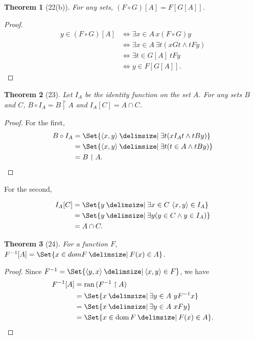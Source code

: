 \documentclass[12pt]{article}
\theoremstyle{plain}
\newtheorem*{exthm}{Theorem}
\theoremstyle{remark}
\theoremstyle{definition}
\theoremstyle{remark}
\providecommand\st{}
\newcommand\SetSymbol[1][]{%
  \nonscript\:#1\vert%
  \allowbreak%
  \nonscript\:
\mathopen{}}
\DeclarePairedDelimiter{\ang}{\langle}{\rangle}
\renewcommand\st{\SetSymbol[\delimsize]}
\renewcommand{\iff}{\Leftrightarrow}
\DeclareMathOperator{\dom}{dom}
\DeclareMathOperator{\ran}{ran}
\begin{document}
\begin{exthm}[22(b)]
  For any sets, $(F \circ G)[A] = F[G[A]]$.
\end{exthm}
\begin{proof}
  \begin{align*}
    y \in (F \circ G)[A] &\iff \exists x \in A\, x (F \circ G)y\\
                         &\iff \exists x \in A\, \exists t (xGt \land tFy)\\
                         &\iff \exists t \in G[A]\ tFy\\
                         &\iff y \in F[G[A]].
  \end{align*}
\end{proof}

\begin{exthm}[23]
  Let $I_A$ be the identity function on the set $A$. For any sets $B$ and $C$, $B \circ I_A = B \restriction A$ and $I_A[C] = A \cap C$.
\end{exthm}
\begin{proof}
  For the first,
  \begin{align*}
    B \circ I_A &= \Set{\ang{x,y} \st \exists t (xI_A t \land tBy)}\\
                &= \Set{\ang{x,y} \st \exists t (t \in A \land tBy)}\\
                &= B \restriction A.
  \end{align*}
\end{proof}

For the second,

\begin{align*}
  I_A [C] &= \Set{y \st \exists x \in C\ \ang{x, y} \in I_A}\\
          &= \Set{y \st \exists y (y \in C \land y \in I_A)}\\
          &= A \cap C.
\end{align*}

\begin{exthm}[24]
  For a function $F$, $F^{-1}[A] = \Set{x \in dom{F} \st F(x) \in A}$.
\end{exthm}

\begin{proof}
  Since $F^{-1} = \Set{\ang{y,x} \st \ang{x, y} \in F}$, we have
  \begin{align*}
    F^{-1}[A] &= \ran{(F^{-1} \restriction A)}\\
              &= \Set{x \st \exists y \in A\ y F^{-1} x}\\
              &= \Set{x \st \exists y \in A\ x F y}\\
              &= \Set{x \in \dom{F} \st F(x) \in A}.
  \end{align*}
\end{proof}
\end{document}
